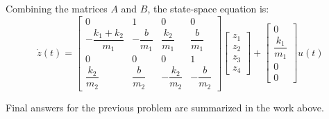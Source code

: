 \documentclass[12pt]{article}
\begin{document}
Combining the matrices \( A \) and \( B \), the state-space equation is:
\[
\dot{z}(t) = \begin{bmatrix}
0 & 1 & 0 & 0 \\
-\dfrac{k_1 + k_2}{m_1} & -\dfrac{b}{m_1} & \dfrac{k_2}{m_1} & \dfrac{b}{m_1} \\
0 & 0 & 0 & 1 \\
\dfrac{k_2}{m_2} & \dfrac{b}{m_2} & -\dfrac{k_2}{m_2} & -\dfrac{b}{m_2}
\end{bmatrix}
\begin{bmatrix}
z_1 \\
z_2 \\
z_3 \\
z_4
\end{bmatrix}
+
\begin{bmatrix}
0 \\
\dfrac{k_1}{m_1} \\
0 \\
0
\end{bmatrix}
u(t)
\]


\begin{resultsbox}
Final answers for the previous problem are summarized in the work above.
\end{resultsbox}
\end{document}
